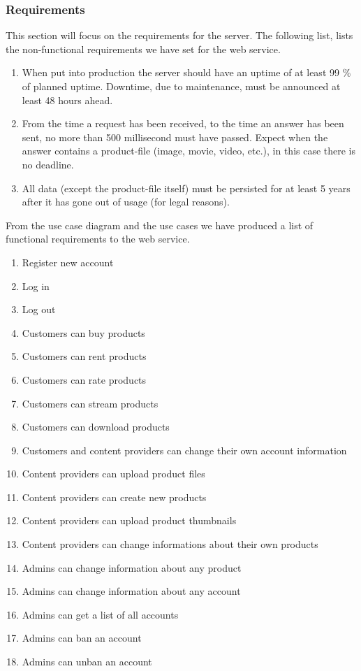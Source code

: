 \subsubsection{Requirements}
\label{s_serviceRequirements}
This section will focus on the requirements for the server. The following list, lists the non-functional requirements we have set for the web service.
\\
\begin{enumerate}[label=NFR-\arabic*]
	\item When put into production the server should have an uptime of at least 99 \% of planned uptime. Downtime, due to maintenance, must be announced at least 48 hours ahead.
	\item From the time a request has been received, to the time an answer has been sent, no more than 500 millisecond must have passed. Expect when the answer contains a product-file (image, movie, video, etc.), in this case there is no deadline.
	\item All data (except the product-file itself) must be persisted for at least 5 years after it has gone out of usage (for legal reasons).
\end{enumerate}

From the use case diagram and the use cases we have produced a list of functional requirements to the web service.

\begin{enumerate}[label=FR-\arabic*]
	\item Register new account
	\item Log in
	\item Log out
	\item Customers can buy products
	\item Customers can rent products
	\item Customers can rate products
	\item Customers can stream products
	\item Customers can download products
	\item Customers and content providers can change their own account information
	\item Content providers can upload product files
	\item Content providers can create new products
	\item Content providers can upload product thumbnails
	\item Content providers can change informations about their own products
	\item Admins can change information about any product
	\item Admins can change information about any account
	\item Admins can get a list of all accounts
	\item Admins can ban an account
	\item Admins can unban an account
\end{enumerate}
